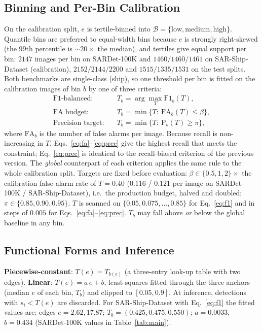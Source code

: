 \documentclass[journal]{IEEEtran}
\providecommand{\linelabel}[1]{}
\begin{document}
\subsection{Binning and Per-Bin Calibration}
\label{sec:calib}
On the calibration split, $e$ is tertile-binned into
$\mathcal{B}=\{\text{low},\text{medium},\text{high}\}$. Quantile bins are
preferred to equal-width bins because $e$ is strongly right-skewed (the
\linelabel{ln:bins}99th percentile is $\sim20\times$ the median), and tertiles give equal
support per bin: $2147$ images per bin on SARDet-100K and
$1460/1460/1461$ on SAR-Ship-Dataset (calibration), $2152/2144/2200$ and
$1515/1335/1531$ on the test splits. \linelabel{ln:single}Both benchmarks are single-class (ship), so one threshold
per bin is fitted on the calibration images of bin $b$ by one of three
criteria:
\begin{align}
  \text{F1-balanced:}\quad & T_b=\arg\max_T \mathrm{F1}_b(T), \label{eq:f1}\\
  \text{FA budget:}\quad & T_b=\min\{T:\ \mathrm{FA}_b(T)\le\beta\}, \label{eq:fa}\\
  \text{Precision target:}\quad & T_b=\min\{T:\ \mathrm{P}_b(T)\ge\pi\}, \label{eq:prec}
\end{align}
where $\mathrm{FA}_b$ is the number of false alarms per image. Because
recall is non-increasing in $T$, Eqs.~\eqref{eq:fa}--\eqref{eq:prec} give
the highest recall that meets the constraint; Eq.~\eqref{eq:prec} is
identical to the recall-biased criterion of the previous version. The
\emph{global} counterpart of each criterion applies the same rule to the
whole calibration split. Targets are fixed before evaluation:
$\beta\in\{0.5,1,2\}\times$ the calibration false-alarm rate of
$T{=}0.40$ ($0.116$ / $0.121$ per image on SARDet-100K /
SAR-Ship-Dataset), i.e.\ the production budget, halved and doubled;
$\pi\in\{0.85,0.90,0.95\}$. $T$ is scanned on
$\{0.05,0.075,\dots,0.85\}$ for Eq.~\eqref{eq:f1} and in steps of $0.005$
for Eqs.~\eqref{eq:fa}--\eqref{eq:prec}. $T_b$ may fall above \emph{or}
below the global baseline in any bin.\linelabel{ln:dir}

\subsection{Functional Forms and Inference}
\linelabel{ln:derived}\textbf{Piecewise-constant}: $T(e)=T_{b(e)}$ (a three-entry look-up table
with two edges). \textbf{Linear}: $T(e)=a\,e+b$, least-squares fitted
through the three anchors (median $e$ of each bin, $T_b$) and clipped to
$[0.05,0.9]$. At inference, detections with $s_i<T(e)$ are discarded. For
SAR-Ship-Dataset with Eq.~\eqref{eq:f1} the fitted values are: edges
$e{=}2.62, 17.87$; $T_b=(0.425, 0.475, 0.550)$; $a{=}0.0033$, $b{=}0.434$
(SARDet-100K values in Table~\ref{tab:main}).\linelabel{ln:derivedend}
\end{document}
